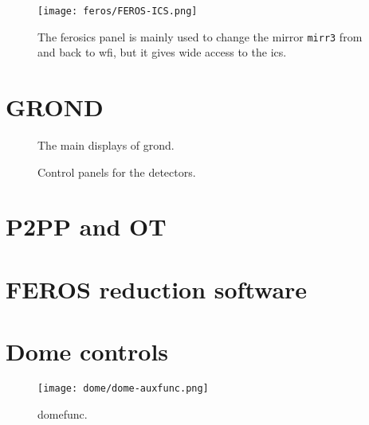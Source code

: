 \documentclass[11pt,fleqn,a4paper]{book}
\begin{document}
\begin{figure}[!ht]
\centering
\texttt{[image: feros/FEROS-ICS.png]}
\caption[FEROS instrument control software panel]{The \gls{ferosics} panel is mainly used to change the mirror \texttt{\gls{mirr3}} from and back to \gls{wfi}, but it gives wide access to the \acrlong{ics}.}
\label{fig:ferosics}
\end{figure}


\section{GROND}

\begin{figure}[!ht]
\centering
{}\hfill
{}
\caption[The main displays of GROND]{The main displays of \gls{grond}.}
\label{fig:grondmain}
\end{figure}

\begin{figure}[!ht]
\centering
{}\hfill
{}
\caption{Control panels for the detectors.}
\label{fig:gronddet}
\end{figure}



\section{P2PP and OT}

\section{FEROS reduction software}

\section{Dome controls}
\begin{figure}[!ht]
\centering
\texttt{[image: dome/dome-auxfunc.png]}
\caption[Dome auxiliary functions]{\gls{domefunc}.}
\label{fig:domefunc}
\end{figure}
\end{document}
